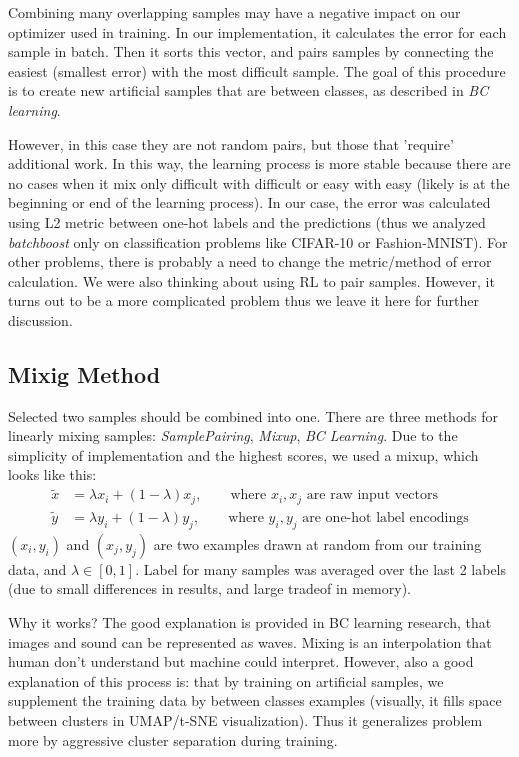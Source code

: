 \documentclass{article}
\begin{document}
Combining many overlapping samples may have a negative impact on our optimizer
used in training.  In our implementation, it calculates the error for each
sample in batch.  Then it sorts this vector, and pairs samples by connecting the
easiest (smallest error) with the most difficult sample.  The goal of this
procedure is to create new artificial samples that are between classes, as
described in \emph{BC learning}.

However, in this case they are not random pairs, but those that 'require'
additional work. In this way, the learning process is more stable because there
are no cases when it mix only difficult with difficult or easy with easy (likely
is at the beginning or end of the learning process).
%
In our case, the error was calculated using L2 metric between one-hot labels and
the predictions (thus we analyzed \emph{batchboost} only on classification
problems like CIFAR-10\cite{krizhevsky2009learning} or
Fashion-MNIST\cite{xiao2017}). For other problems, there is probably
a need to change the metric/method of error calculation.
%
We were also thinking about using RL to pair samples. However, it turns out to
be a more complicated problem thus we leave it here for further discussion.

\subsection{Mixig Method}
\label{sec:mixing}

Selected two samples should be combined into one.
There are three methods for linearly mixing samples: \emph{SamplePairing},
\emph{Mixup}, \emph{BC Learning}. Due to the simplicity of implementation and
the highest scores, we used a mixup, which looks like this:
%
\begin{align*}
  \tilde{x} &= \lambda x_i + (1 - \lambda) x_j,\qquad \text{where~} x_i, x_j \text{~are~raw~input~vectors}\\
  \tilde{y} &= \lambda y_i + (1 - \lambda) y_j,\qquad \text{where~} y_i, y_j \text{~are~one-hot~label~encodings}
\end{align*}
$(x_i, y_i)$ and $(x_j, y_j)$ are two examples drawn at random from our
training data, and $\lambda \in [0,1]$.
Label for many samples was averaged over the last 2 labels (due to small differences in results, and large tradeof in memory).

Why it works?
The good explanation is provided in BC learning research, that images and sound
can be represented as waves. Mixing is an interpolation that human don't
understand but machine could interpret.
However, also a good explanation of this process is: that by training on
artificial samples, we supplement the training data by between classes examples
(visually, it fills space between clusters in UMAP/t-SNE visualization).
Thus it generalizes problem more by aggressive cluster separation during training.
\end{document}
